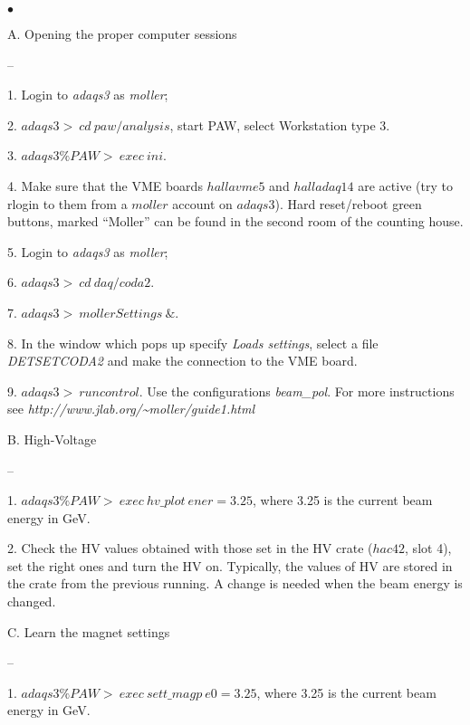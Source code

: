 {\begin{list}{$\bullet$}{\setlength{\itemsep}{0.5cm}}
  \item[A.] Opening the proper computer sessions
        \begin{list}{--}{\setlength{\itemsep}{0.cm}}
             \item[1.] Login to {\it adaqs3} as {\it moller};
             \item[2.] $adaqs3>~cd~paw/analysis$, start PAW, select Workstation type 3.  
             \item[3.] $adaqs3\%PAW>~exec~ini$.
             \item[4.] Make sure that the VME boards $hallavme5$ and $halladaq14$
                       are active (try to rlogin to them from a $moller$ account
                       on $adaqs3$). Hard reset/reboot green buttons, marked ``Moller''
                       can be found in the second room of the counting house.
             \item[5.] Login to {\it adaqs3} as {\it moller};
             \item[6.] $adaqs3>~cd~daq/coda2$.  
             \item[7.] $adaqs3>~mollerSettings~ \&$.  
             \item[8.] In the window which pops up specify {\it Loads settings}, select
                       a file {\it DETSETCODA2} and make the connection to the VME board.   
             \item[9.] $adaqs3>~runcontrol$. Use the configurations {\it beam\_pol}.
                       For more instructions see {\it http://www.jlab.org/\~{\hbox{}}moller/guide1.html}
        \end{list}
  \item[B.] High-Voltage
        \begin{list}{--}{\setlength{\itemsep}{0.cm}}
             \item[1.] $adaqs3\%PAW>~exec~hv\_plot~ener=3.25$, where
                       3.25 is the current beam energy in GeV. 
             \item[2.] Check the HV values obtained 
                       with those set in the HV crate ($hac42$, slot 4), set the right ones
                       and turn the HV on. Typically, the values of HV are stored in the crate
                       from the previous running. A change is needed when the beam energy 
                       is changed.
        \end{list}
  \item[C.] Learn the magnet settings\label{item:moller_mag_sett}
        \begin{list}{--}{\setlength{\itemsep}{0.cm}}
             \item[1.] $adaqs3\%PAW>~exec~sett\_magp~e0=3.25$, where
                       3.25 is the current beam energy in GeV. 
        \end{list}
\end{list}
}

